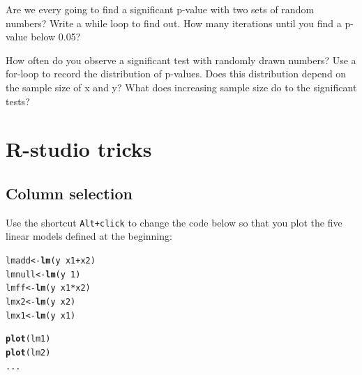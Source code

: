 \documentclass[12pt,a4paper]{scrartcl}\usepackage[]{graphicx}\usepackage[]{color}
\makeatletter
\newcommand{\hlnum}[1]{\textcolor[rgb]{0.686,0.059,0.569}{#1}}%
\newcommand{\hlopt}[1]{\textcolor[rgb]{0,0,0}{#1}}%
\newcommand{\hlstd}[1]{\textcolor[rgb]{0.345,0.345,0.345}{#1}}%
\newcommand{\hlkwb}[1]{\textcolor[rgb]{0.69,0.353,0.396}{#1}}%
\newcommand{\hlkwd}[1]{\textcolor[rgb]{0.737,0.353,0.396}{\textbf{#1}}}%
\newenvironment{kframe}{%
 \def\at@end@of@kframe{}%
 \ifinner\ifhmode%
  \def\at@end@of@kframe{\end{minipage}}%
  \begin{minipage}{\columnwidth}%
 \fi\fi%
 \def\FrameCommand##1{\hskip\@totalleftmargin \hskip-\fboxsep
 \colorbox{shadecolor}{##1}\hskip-\fboxsep
     \hskip-\linewidth \hskip-\@totalleftmargin \hskip\columnwidth}%
 \MakeFramed {\advance\hsize-\width
   \@totalleftmargin\z@ \linewidth\hsize
   \@setminipage}}%
 {\par\unskip\endMakeFramed%
 \at@end@of@kframe}
\newenvironment{knitrout}{}{} %
\makeatother
\begin{document}
\begin{Exercise}[difficulty=2]
Are we every going to find a significant p-value with two sets of random numbers? Write a while loop to find out. How many iterations until you find a p-value below 0.05?
\end{Exercise}


\begin{Exercise}[difficulty=3]
How often do you observe a significant test with randomly drawn numbers? Use a for-loop to record the distribution of p-values. Does this distribution depend on the sample size of x and y? What does increasing sample size do to the significant tests?
\end{Exercise}

\section{R-studio tricks}

\subsection{Column selection}

\begin{Exercise}[difficulty=1]
Use the shortcut  \texttt{Alt+click} to change the code below so that you plot the five linear models defined at the beginning:
\begin{knitrout}
\color{fgcolor}\begin{kframe}
\begin{alltt}
\hlstd{lmadd}  \hlkwb{<-} \hlkwd{lm}\hlstd{(y} \hlopt{~} \hlstd{x1} \hlopt{+} \hlstd{x2)}
\hlstd{lmnull} \hlkwb{<-} \hlkwd{lm}\hlstd{(y} \hlopt{~} \hlnum{1}\hlstd{)}
\hlstd{lmff}   \hlkwb{<-} \hlkwd{lm}\hlstd{(y} \hlopt{~} \hlstd{x1}\hlopt{*}\hlstd{x2)}
\hlstd{lmx2}   \hlkwb{<-} \hlkwd{lm}\hlstd{(y} \hlopt{~} \hlstd{x2)}
\hlstd{lmx1}   \hlkwb{<-} \hlkwd{lm}\hlstd{(y} \hlopt{~} \hlstd{x1)}


\hlkwd{plot}\hlstd{(lm1)}
\hlkwd{plot}\hlstd{(lm2)}
\hlstd{...}
\end{alltt}
\end{kframe}
\end{knitrout}
\end{Exercise}
 
\end{document}
